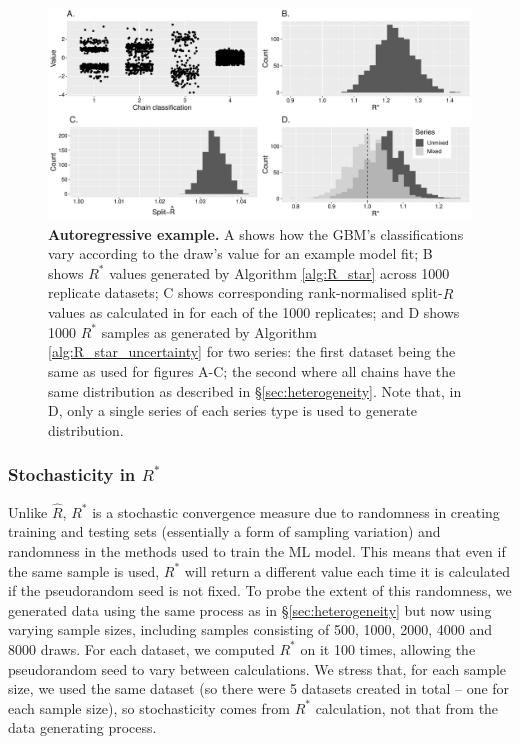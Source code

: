 \documentclass{article}
\begin{document}
\begin{figure}[!htb]
	\centerline{\includegraphics[width=1.0\textwidth]{../output/ar1.pdf}}
	\caption{\textbf{Autoregressive example.} A shows how the GBM's classifications vary according to the draw's value for an example model fit; B shows $R^*$ values generated by Algorithm \ref{alg:R_star} across 1000 replicate datasets; C shows corresponding rank-normalised split-$\widehat{R}$ values as calculated in \cite{vehtari2019rank} for each of the 1000 replicates; and D shows 1000 $R^*$ samples as generated by Algorithm \ref{alg:R_star_uncertainty} for two series: the first dataset being the same as used for figures A-C; the second where all chains have the same distribution as described in \S\ref{sec:heterogeneity}. Note that, in D, only a single series of each series type is used to generate distribution.}
	\label{fig:ar1}
\end{figure}

\subsubsection{Stochasticity in $R^*$}\label{sec:heterogeneity_stochasticity}
Unlike $\widehat{R}$, $R^*$ is a stochastic convergence measure due to randomness in creating training and testing sets (essentially a form of sampling variation) and randomness in the methods used to train the ML model. This means that even if the same sample is used, $R^*$ will return a different value each time it is calculated if the pseudorandom seed is not fixed. To probe the extent of this randomness, we generated data using the same process as in \S\ref{sec:heterogeneity} but now using varying sample sizes, including samples consisting of 500, 1000, 2000, 4000 and 8000 draws. For each dataset, we computed $R^*$ on it 100 times, allowing the pseudorandom seed to vary between calculations. We stress that, for each sample size, we used the same dataset (so there were 5 datasets created in total -- one for each sample size), so stochasticity comes from $R^*$ calculation, not that from the data generating process.
\end{document}

